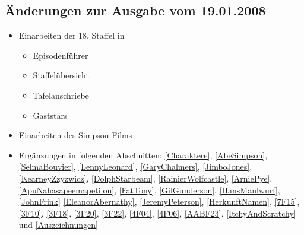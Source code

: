 \documentclass[pagesize,twoside,german]{scrbook}
\begin{document}
\subsection*{Änderungen zur Ausgabe vom 19.01.2008}
\begin{itemize}
	\item Einarbeiten der 18. Staffel in
	\begin{itemize}
		\item Episodenführer
		\item Staffelübersicht
		\item Tafelanschriebe
		\item Gaststars
	\end{itemize}
	\item Einarbeiten des Simpson Films
	\item Ergänzungen in folgenden Abschnitten: \ref{Charaktere}, \ref{AbeSimpson}, \ref{SelmaBouvier}, \ref{LennyLeonard}, \ref{GaryChalmers}, \ref{JimboJones}, \ref{KearneyZzyzwicz}, \ref{DolphStarbeam}, \ref{RainierWolfcastle}, \ref{ArniePye}, \ref{ApuNahasapeemapetilon}, \ref{FatTony}, \ref{GilGunderson}, \ref{HansMaulwurf}, \ref{JohnFrink} \ref{EleanorAbernathy}, \ref{JeremyPeterson}, \ref{HerkunftNamen}, \ref{7F15}, \ref{3F10}, \ref{3F18}, \ref{3F20}, \ref{3F22}, \ref{4F04}, \ref{4F06}, \ref{AABF23}, \ref{ItchyAndScratchy} und \ref{Auszeichnungen}
\end{itemize}

\newpage

\HTMLOutput{}
{}

\tableofcontents

~\newpage

\setcounter{page}{0}





\HTMLOutput{}
{
~\newpage
{}
{}
}



\HTMLOutput{}
{
~\newpage
{}
{}
\printindex
}


\end{document}
